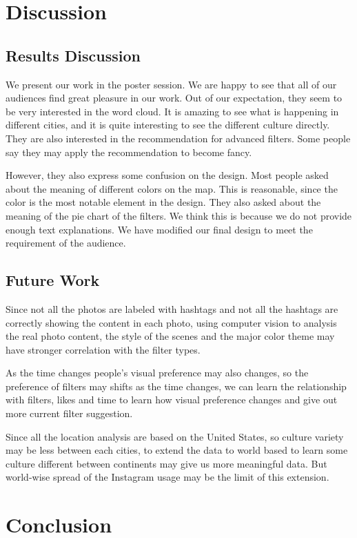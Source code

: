 \documentclass[conference]{acmsiggraph}
\begin{document}
\section{Discussion}

\subsection{Results Discussion}

We present our work in the poster session. We are happy to see that all of our audiences find great pleasure in our work. Out of our expectation, they seem to be very interested in the word cloud. It is amazing to see what is happening in different cities, and it is quite interesting to see the different culture directly. They are also interested in the recommendation for advanced filters. Some people say they may apply the recommendation to become fancy.


However, they also express some confusion on the  design. Most people asked about the meaning of different colors on the map. This is reasonable, since the color is the most notable element in the design. They also asked about the meaning of the pie chart of the filters. We think this is because we do not provide enough text explanations. We have modified our final design  to meet the requirement of the audience.

\subsection{Future Work}
Since not all the photos are labeled with hashtags and not all the hashtags are correctly showing the content in each photo, using computer vision to analysis the real photo content, the style of the scenes and the major color theme may have stronger correlation with the filter types.

As the time changes people's visual preference may also changes, so the preference of filters may shifts as the time changes, we can learn the relationship with filters, likes and time to learn how visual preference changes and give out more current filter suggestion.

Since all the location analysis are based on the United States, so culture variety may be less between each cities, to extend the data to world based to learn some culture different between continents may give us more meaningful data. But world-wise spread of the Instagram usage may be the limit of this extension.

\section{Conclusion}
\end{document}

